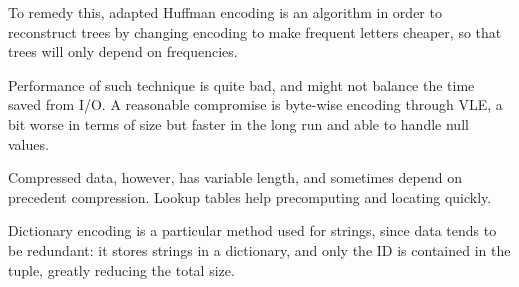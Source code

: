 To remedy this, adapted Huffman encoding is an algorithm in order to reconstruct trees by changing encoding to make frequent letters cheaper, so that trees will only depend on frequencies.

Performance of such technique is quite bad, and might not balance the time saved from I/O. A reasonable compromise is byte-wise encoding through VLE, a bit worse in terms of size but faster in the long run and able to handle null values.

Compressed data, however, has variable length, and sometimes depend on precedent compression. Lookup tables help precomputing and locating quickly.

Dictionary encoding is a particular method used for strings, since data tends to be redundant: it stores strings in a dictionary, and only the ID is contained in the tuple, greatly reducing the total size. 


